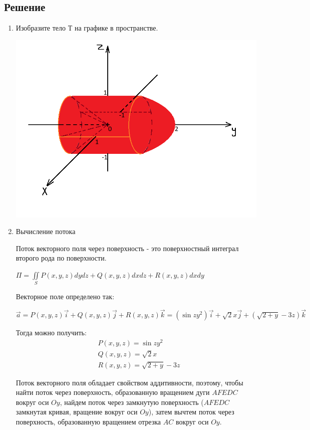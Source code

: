 \subsection{Решение}
\begin{enumerate}
    \item Изобразите тело Т на графике в пространстве.
    
    \includegraphics[scale = 0.5]{images/Math_RW4_task3.png}

    \item Вычисление потока

    Поток векторного поля через поверхность - это поверхностный интеграл второго рода по поверхности.

    $\Pi = \iint\limits_{S} P(x,y,z)dydz + Q(x,y,z)dxdz + R(x,y,z)dxdy$

    Векторное поле определено так: 
    
    $\Vec{a} = P(x,y,z)\Vec{i} + Q(x,y,z)\Vec{j} + R(x,y,z)\Vec{k} = (\sin{zy^2})\Vec{i} + \sqrt{2}x\Vec{j} + (\sqrt{2+y}-3z)\Vec{k}$

    Тогда можно получить:
    \begin{align*}
        &P(x,y,z) = \sin{zy^2}\\ 
        &Q(x,y,z) = \sqrt{2}x\\ 
        &R(x,y,z) = \sqrt{2+y}-3z
    \end{align*}

    Поток векторного поля обладает свойством аддитивности, поэтому, чтобы найти поток через поверхность, образованную вращением дуги $AFEDC$ вокруг оси $Oy$, найдем поток через замкнутую поверхность ($AFEDC$ замкнутая кривая, вращение вокруг оси $Oy$), затем вычтем поток через поверхность, образованную вращением отрезка $AC$ вокруг оси $Oy$.


\end{enumerate}
